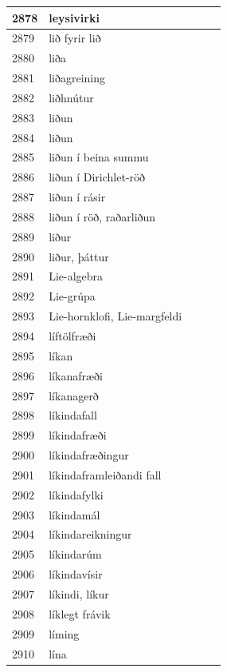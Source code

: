 \begin{longtable}{p{}|p{}|p{}|p{}|p{}}
\hline
2878 & leysivirki &  &  &  \\
\hline
2879 & lið fyrir lið &  &  &  \\
\hline
2880 & liða &  &  &  \\
\hline
2881 & liðagreining &  &  &  \\
\hline
2882 & liðhnútur &  &  &  \\
\hline
2883 & liðun &  &  &  \\
\hline
2884 & liðun &  &  &  \\
\hline
2885 & liðun í beina summu &  &  &  \\
\hline
2886 & liðun í Dirichlet-röð &  &  &  \\
\hline
2887 & liðun í rásir &  &  &  \\
\hline
2888 & liðun í röð, raðarliðun &  &  &  \\
\hline
2889 & liður &  &  &  \\
\hline
2890 & liður, þáttur &  &  &  \\
\hline
2891 & Lie-algebra &  &  &  \\
\hline
2892 & Lie-grúpa &  &  &  \\
\hline
2893 & Lie-hornklofi, Lie-margfeldi &  &  &  \\
\hline
2894 & líftölfræði &  &  &  \\
\hline
2895 & líkan &  &  &  \\
\hline
2896 & líkanafræði &  &  &  \\
\hline
2897 & líkanagerð &  &  &  \\
\hline
2898 & líkindafall &  &  &  \\
\hline
2899 & líkindafræði &  &  &  \\
\hline
2900 & líkindafræðingur &  &  &  \\
\hline
2901 & líkindaframleiðandi fall &  &  &  \\
\hline
2902 & líkindafylki &  &  &  \\
\hline
2903 & líkindamál &  &  &  \\
\hline
2904 & líkindareikningur &  &  &  \\
\hline
2905 & líkindarúm &  &  &  \\
\hline
2906 & líkindavísir &  &  &  \\
\hline
2907 & líkindi, líkur &  &  &  \\
\hline
2908 & líklegt frávik &  &  &  \\
\hline
2909 & líming &  &  &  \\
\hline
2910 & lína &  &  &  \\

\end{longtable}
